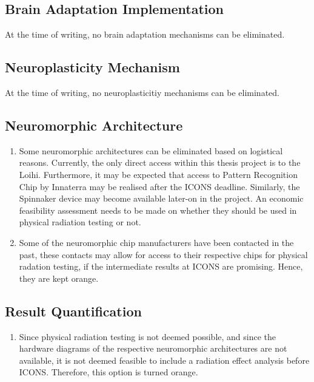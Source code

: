 \subsection{Brain Adaptation Implementation}\label{subsec:baseline_brain_adaptation_implementation}
At the time of writing, no brain adaptation mechanisms can be eliminated.

\subsection{Neuroplasticity Mechanism}\label{subsec:baseline_neuroplasticity_mechanism}
At the time of writing, no neuroplasticitiy mechanisms can be eliminated.

\subsection{Neuromorphic Architecture}\label{subsec:baseline_neuromorphic_architecture}
\begin{enumerate}
    \item Some neuromorphic architectures can be eliminated based on logistical reasons. Currently, the only direct access within this thesis project is to the Loihi. Furthermore, it may be expected that access to Pattern Recognition Chip by Innaterra may be realised after the ICONS deadline. Similarly, the Spinnaker device may become available later-on in the project. An economic feasibility assessment needs to be made on whether they should be used in physical radiation testing or not.
    \item Some of the neuromorphic chip manufacturers have been contacted in the past, these contacts may allow for access to their respective chips for physical radation testing, if the intermediate results at ICONS are promising. Hence, they are kept orange.
\end{enumerate}

\subsection{Result Quantification}\label{subsec:baseline_result_quantification}
\begin{enumerate}
    \item Since physical radiation testing is not deemed possible, and since the hardware diagrams of the respective neuromorphic architectures are not available, it is not deemed feasible to include a radiation effect analysis before ICONS. Therefore, this option is turned orange.
\end{enumerate}


